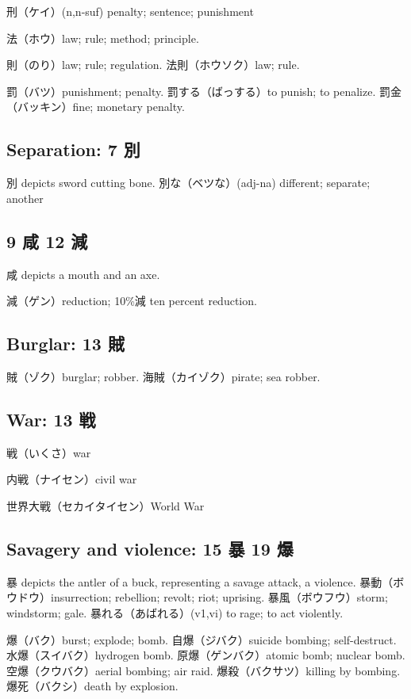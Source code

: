 刑（ケイ）(n,n-suf) penalty; sentence; punishment

法（ホウ）law; rule; method; principle.

則（のり）law; rule; regulation.
法則（ホウソク）law; rule.

罰（バツ）punishment; penalty.
罰する（ばっする）to punish; to penalize.
罰金（バッキン）fine; monetary penalty.

\subsection{Separation: 7 別}

別 depicts sword cutting bone.
別な（ベツな）(adj-na) different; separate; another

\subsection{9 咸 12 減}

咸 depicts a mouth and an axe.

減（ゲン）reduction; 10\%減 ten percent reduction.

\subsection{Burglar: 13 賊}

賊（ゾク）burglar; robber.
海賊（カイゾク）pirate; sea robber.

\subsection{War: 13 戦}

戦（いくさ）war

内戦（ナイセン）civil war

世界大戦（セカイタイセン）World War

\subsection{Savagery and violence: 15 暴 19 爆}

暴 depicts the antler of a buck, representing a savage attack, a violence.
暴動（ボウドウ）insurrection; rebellion; revolt; riot; uprising.
暴風（ボウフウ）storm; windstorm; gale.
暴れる（あばれる）(v1,vi) to rage; to act violently.

爆（バク）burst; explode; bomb.
自爆（ジバク）suicide bombing; self-destruct.
水爆（スイバク）hydrogen bomb.
原爆（ゲンバク）atomic bomb; nuclear bomb.
空爆（クウバク）aerial bombing; air raid.
爆殺（バクサツ）killing by bombing.
爆死（バクシ）death by explosion.

